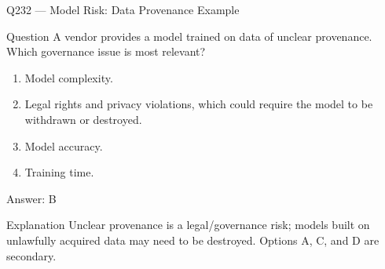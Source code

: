 \documentclass[aspectratio=169,8pt]{beamer}
\begin{document}
																																							\begin{frame}{Q232 --- Model Risk: Data Provenance Example}
																																								\begin{block}{Question}
																																									A vendor provides a model trained on data of unclear provenance. Which governance issue is most relevant?
																																									\begin{enumerate}
																																										\item Model complexity.
																																										\item Legal rights and privacy violations, which could require the model to be withdrawn or destroyed.
																																										\item Model accuracy.
																																										\item Training time.
																																									\end{enumerate}  \end{block}
																																									\begin{exampleblock}{Answer: B}\end{exampleblock}
																																									\begin{block}{Explanation}
																																										Unclear provenance is a legal/governance risk; models built on unlawfully acquired data may need to be destroyed. Options A, C, and D are secondary.
																																									\end{block}
																																								\end{frame}
																																								
\end{document}
